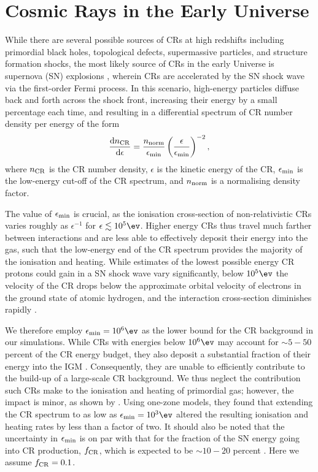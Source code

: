 \section{Cosmic Rays in the Early Universe}
\label{sec:context}
While there are several possible sources of CRs at high redshifts including primordial black holes, topological defects, supermassive particles, and structure formation shocks, the most likely source of CRs in the early Universe is supernova (SN) explosions \citep[e.g.,][]{GinzburgSyrovatskii1969,BiermannSigl2001,Stanev2004,Pfrommeretal2006}, wherein CRs are accelerated by the SN shock wave via the first-order Fermi process.  In this scenario, high-energy particles diffuse back and forth across the shock front, increasing their energy by a small percentage each time, and resulting in a differential spectrum of CR number density per energy \citep{Longair1994} of the form
\begin{equation}
    \frac{{\rm d}n_{\rm \small CR}}{{\rm d}\epsilon} = \frac{n_{\rm norm}}{\epsilon_{\rm min}}
    \left( \frac{\epsilon}{\epsilon_{\rm min}} \right)^{-2},
\end{equation}
where $n_{\rm \small CR}$ is the CR number density, $\epsilon$ is the kinetic energy of the CR, $\epsilon_{\rm min}$ is the low-energy cut-off of the CR spectrum, and $n_{\rm norm}$ is a normalising density factor. 

The value of $\epsilon_{\rm min}$ is crucial, as the ionisation cross-section of non-relativistic CRs varies roughly as $\epsilon^{-1}$ for $\epsilon \lesssim 10^5\ev$. Higher energy CRs thus travel much farther between interactions and are less able to effectively deposit their energy into the gas, such that the low-energy end of the CR spectrum provides the majority of the ionisation and heating.  While estimates of the lowest possible energy CR protons could gain in a SN shock wave vary significantly, below $10^5\ev$ the velocity of the CR drops below the approximate orbital velocity of electrons in the ground state of atomic hydrogen, and the interaction cross-section diminishes rapidly \citep{Schlickeiser2002}. 

We therefore employ $\epsilon_{\rm min} = 10^6\ev$ as the lower bound for the CR background in our simulations.  While CRs with energies below $10^6\ev$ may account for $\sim$$5-50$ percent of the CR energy budget, they also deposit a substantial fraction of their energy into the IGM \citep{SazonovSunyaev2015}. Consequently, they are unable to efficiently contribute to the build-up of a large-scale CR background. We thus neglect the contribution such CRs make to the ionisation and heating of primordial gas; however, the impact is minor, as shown by \citet{StacyBromm2007}. Using one-zone models, they found that extending the CR spectrum to as low as $\epsilon_{\rm min} = 10^3\ev$ altered the resulting ionisation and heating rates by less than a factor of two.  It should also be noted that the uncertainty in $\epsilon_{\rm min}$ is on par with that for the fraction of the SN energy going into CR production, $f_{\rm \small CR}$, which is expected to be $\sim$$10-20$ percent \citep{CaprioliSpitkovsky2014}.  Here we assume $f_{\rm \small CR} = 0.1$.

